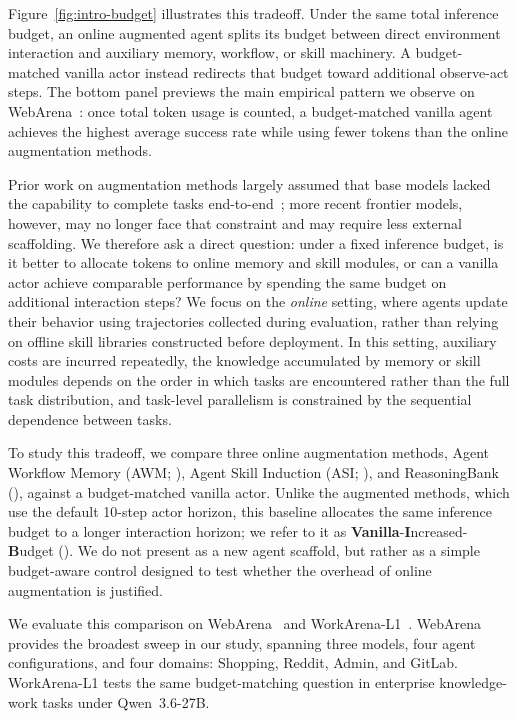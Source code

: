 Figure~\ref{fig:intro-budget} illustrates this tradeoff.
Under the same total inference budget, an online augmented agent splits its budget between direct environment interaction and auxiliary memory, workflow, or skill machinery.
A budget-matched vanilla actor instead redirects that budget toward additional observe-act steps.
The bottom panel previews the main empirical pattern we observe on WebArena~\citep{zhou-etal-2024-webarena}: once total token usage is counted, a budget-matched vanilla agent achieves the highest average success rate while using fewer tokens than the online augmentation methods.

Prior work on augmentation methods largely assumed that base models lacked the capability to complete tasks end-to-end~\citep{wang-etal-2024-agent,wang-etal-2025-asi}; more recent frontier models, however, may no longer face that constraint and may require less external scaffolding.
We therefore ask a direct question: under a fixed inference budget, is it better to allocate tokens to online memory and skill modules, or can a vanilla actor achieve comparable performance by spending the same budget on additional interaction steps?
We focus on the \emph{online} setting, where agents update their behavior using trajectories collected during evaluation, rather than relying on offline skill libraries constructed before deployment.
In this setting, auxiliary costs are incurred repeatedly, the knowledge accumulated by memory or skill modules depends on the order in which tasks are encountered rather than the full task distribution, and task-level parallelism is constrained by the sequential dependence between tasks.

To study this tradeoff, we compare three online augmentation methods, Agent Workflow Memory (AWM; \citealp{wang-etal-2024-agent}), Agent Skill Induction (ASI; \citealp{wang-etal-2025-asi}), and ReasoningBank (\citealp{ouyang-etal-2025-reasoningbank}), against a budget-matched vanilla actor.
Unlike the augmented methods, which use the default 10-step actor horizon, this baseline allocates the same inference budget to a longer interaction horizon; we refer to it as \textbf{Vanilla}-\textbf{I}ncreased-\textbf{B}udget (\textbf{\budgetactor{}}).
We do not present \budgetactor{} as a new agent scaffold, but rather as a simple budget-aware control designed to test whether the overhead of online augmentation is justified.

We evaluate this comparison on WebArena~\citep{zhou-etal-2024-webarena} and WorkArena-L1~\citep{drouin-etal-2024-workarena}.
WebArena provides the broadest sweep in our study, spanning three models, four agent configurations, and four domains: Shopping, Reddit, Admin, and GitLab.
WorkArena-L1 tests the same budget-matching question in enterprise knowledge-work tasks under Qwen~3.6-27B.

